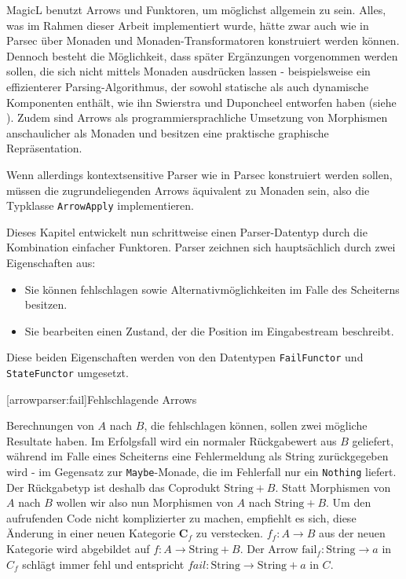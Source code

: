 \documentclass[11pt, a4paper, bibgerm]{scrbook}
\newcommand\icode[1]{\lstinline?#1?}
\newcommand\lsection{}
\begin{document}
MagicL benutzt Arrows und Funktoren, um möglichst allgemein zu
sein. Alles, was im Rahmen dieser Arbeit implementiert wurde, hätte zwar
auch wie in Parsec über Monaden und Monaden-Transformatoren konstruiert
werden können. Dennoch besteht die Möglichkeit, dass später Ergänzungen
vorgenommen werden sollen, die sich nicht mittels Monaden ausdrücken
lassen - beispielsweise ein effizienterer Parsing-Algorithmus, der
sowohl statische als auch dynamische Komponenten enthält, wie ihn
Swierstra und Duponcheel entworfen haben (siehe
\cite[S. 8ff]{Hughes}). Zudem sind Arrows als programmiersprachliche
Umsetzung von Morphismen anschaulicher als Monaden und besitzen eine
praktische graphische Repräsentation.

Wenn allerdings kontextsensitive Parser wie in Parsec konstruiert werden
sollen, müssen die zugrundeliegenden Arrows äquivalent zu Monaden sein,
also die Typklasse \icode{ArrowApply} implementieren.

Dieses Kapitel entwickelt nun schrittweise einen Parser-Datentyp durch
die Kombination einfacher Funktoren. Parser zeichnen sich hauptsächlich
durch zwei Eigenschaften aus:
\begin{itemize}
\item Sie können fehlschlagen sowie Alternativmöglichkeiten im Falle des
  Scheiterns besitzen.
\item Sie bearbeiten einen Zustand, der die Position im Eingabestream
  beschreibt.
\end{itemize}
Diese beiden Eigenschaften werden von den Datentypen \icode{FailFunctor}
und \icode{StateFunctor} umgesetzt.

\lsection[arrowparser:fail]{Fehlschlagende Arrows}

Berechnungen von $A$ nach $B$, die fehlschlagen können, sollen zwei
mögliche Resultate haben. Im Erfolgsfall wird ein normaler Rückgabewert
aus $B$ geliefert, während im Falle eines Scheiterns eine Fehlermeldung
als String zurückgegeben wird - im Gegensatz zur \icode{Maybe}-Monade,
die im Fehlerfall nur ein \icode{Nothing} liefert. Der Rückgabetyp ist
deshalb das Coprodukt $\mathrm{String}+B$. Statt Morphismen von $A$ nach
$B$ wollen wir also nun Morphismen von $A$ nach $\mathrm{String}+B$. Um
den aufrufenden Code nicht komplizierter zu machen, empfiehlt es sich,
diese Änderung in einer neuen Kategorie $\mathbf{C}_f$ zu
verstecken. $f_{f} : A \rightarrow B$ aus der neuen Kategorie wird
abgebildet auf $f : A \rightarrow \mathrm{String} + B$. Der Arrow
$\mathrm{fail}_{f} : \mathrm{String} \rightarrow a$ in $C_{f}$ schlägt
immer fehl und entspricht $fail : \mathrm{String} \rightarrow
\mathrm{String} + a$ in $C$.
\end{document}
